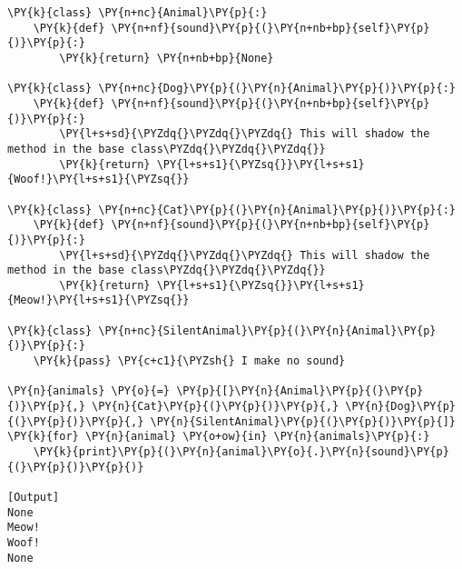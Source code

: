 \begin{Verbatim}[label=\makebox{\url{https://github.com/lucabaldini/cmepda/tree/master/slides/latex/snippets/overload.py}},commandchars=\\\{\}]
\PY{k}{class} \PY{n+nc}{Animal}\PY{p}{:}
    \PY{k}{def} \PY{n+nf}{sound}\PY{p}{(}\PY{n+nb+bp}{self}\PY{p}{)}\PY{p}{:}
        \PY{k}{return} \PY{n+nb+bp}{None}

\PY{k}{class} \PY{n+nc}{Dog}\PY{p}{(}\PY{n}{Animal}\PY{p}{)}\PY{p}{:}
    \PY{k}{def} \PY{n+nf}{sound}\PY{p}{(}\PY{n+nb+bp}{self}\PY{p}{)}\PY{p}{:}
        \PY{l+s+sd}{\PYZdq{}\PYZdq{}\PYZdq{} This will shadow the method in the base class\PYZdq{}\PYZdq{}\PYZdq{}}
        \PY{k}{return} \PY{l+s+s1}{\PYZsq{}}\PY{l+s+s1}{Woof!}\PY{l+s+s1}{\PYZsq{}}
        
\PY{k}{class} \PY{n+nc}{Cat}\PY{p}{(}\PY{n}{Animal}\PY{p}{)}\PY{p}{:}
    \PY{k}{def} \PY{n+nf}{sound}\PY{p}{(}\PY{n+nb+bp}{self}\PY{p}{)}\PY{p}{:}
        \PY{l+s+sd}{\PYZdq{}\PYZdq{}\PYZdq{} This will shadow the method in the base class\PYZdq{}\PYZdq{}\PYZdq{}}
        \PY{k}{return} \PY{l+s+s1}{\PYZsq{}}\PY{l+s+s1}{Meow!}\PY{l+s+s1}{\PYZsq{}}

\PY{k}{class} \PY{n+nc}{SilentAnimal}\PY{p}{(}\PY{n}{Animal}\PY{p}{)}\PY{p}{:}
    \PY{k}{pass} \PY{c+c1}{\PYZsh{} I make no sound}
     
\PY{n}{animals} \PY{o}{=} \PY{p}{[}\PY{n}{Animal}\PY{p}{(}\PY{p}{)}\PY{p}{,} \PY{n}{Cat}\PY{p}{(}\PY{p}{)}\PY{p}{,} \PY{n}{Dog}\PY{p}{(}\PY{p}{)}\PY{p}{,} \PY{n}{SilentAnimal}\PY{p}{(}\PY{p}{)}\PY{p}{]}
\PY{k}{for} \PY{n}{animal} \PY{o+ow}{in} \PY{n}{animals}\PY{p}{:}
    \PY{k}{print}\PY{p}{(}\PY{n}{animal}\PY{o}{.}\PY{n}{sound}\PY{p}{(}\PY{p}{)}\PY{p}{)}

[Output]
None
Meow!
Woof!
None
\end{Verbatim}